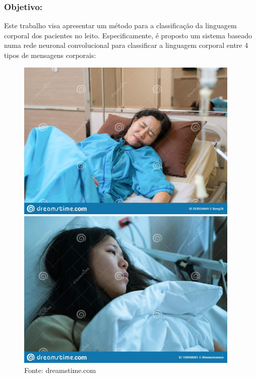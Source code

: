 \begin{frame}
    \frametitle{Objetivo:}
    Este trabalho visa apresentar um método para a classificação 
    da linguagem corporal dos pacientes no leito.
    Especificamente, 
    é proposto um sistema baseado numa rede neuronal 
    convolucional para classificar a linguagem corporal entre 4 tipos de mensagens corporais:
    \begin{figure}[!ht]
    \centering
    \caption{Fonte: dreamstime.com}
        \begin{minipage}[t]{0.23\textwidth}
        \centering
          \includegraphics[width=0.95\textwidth]{images/output-pain.jpg}
        \end{minipage}
        \hfill
        \begin{minipage}[t]{0.23\textwidth}
        \centering
          \includegraphics[width=0.95\textwidth]{images/output-sad.jpg}

\end{minipage}
\end{figure}
\end{frame}
